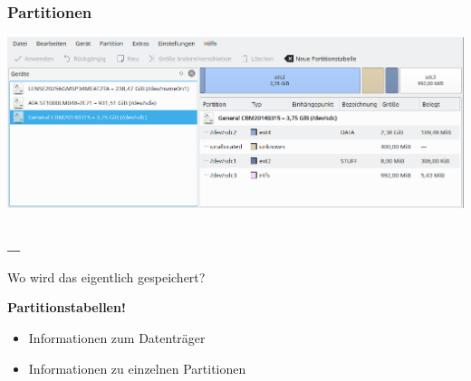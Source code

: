 \begin{frame}
    \frametitle{Partitionen}

    \includegraphics[width=\textwidth]{content/graphics/kparted.png}
\end{frame}

\begin{frame}
    \frametitle{\_}

    \begin{center}
        \vspace{0.2cm}
        \LARGE{Wo wird das eigentlich gespeichert?}
        
        \pause

        \vspace{0.5cm}
        \Huge{\textbf{Partitionstabellen!}}

        \pause

        \vspace{0.5cm}
        \begin{itemize}
            \LARGE
            \item Informationen zum Datenträger
            \item Informationen zu einzelnen Partitionen
        \end{itemize}
    \end{center}

\end{frame}
